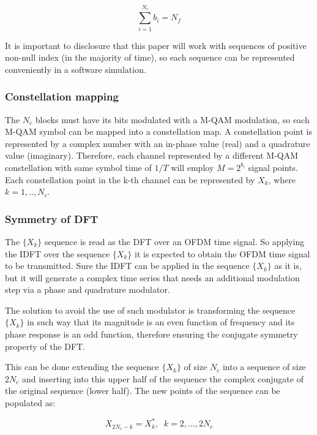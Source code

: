 \begin{equation} \label{eq:bit_sum}
    \sum_{i=1}^{N_c} b_i = N_f
\end{equation}

It is important to disclosure that this paper will work with sequences of positive non-null index (in the majority of time), so each sequence can be represented conveniently in a software simulation.

\subsubsection{Constellation mapping}

The $N_c$ blocks must have its bits modulated with a M-QAM modulation, so each M-QAM symbol can be mapped into a constellation map. A constellation point is represented by a complex number with an in-phase value (real) and a quadrature value (imaginary). Therefore, each channel represented by a different M-QAM constellation with same symbol time of $1/T$ will employ $M = 2^{b_i}$ signal points. Each constellation point in the k-th channel can be represented by $X_k$, where $k = 1,..,N_c$. 

\subsubsection{Symmetry of DFT}

The $\{X_k\}$ sequence is read as the DFT over an OFDM time signal. So applying the IDFT over the sequence $\{X_k\}$ it is expected to obtain the OFDM time signal to be transmitted. Sure the IDFT can be applied in the sequence $\{X_k\}$ as it is, but it will generate a complex time series that needs an additional modulation step via a phase and quadrature modulator. 

The solution to avoid the use of such modulator is transforming the sequence $\{X_k\}$ in such way that its magnitude is an even function of frequency and its phase response is an odd function, therefore ensuring the conjugate symmetry property of the DFT.

This can be done extending the sequence $\{X_k\}$ of size $N_c$ into a sequence of size $2N_c$ and inserting into this upper half of the sequence the complex conjugate of the original sequence (lower half). The new points of the sequence can be populated as:

\begin{equation} \label{eq:symmetry}
    X_{2N_c-k}=X_k^*, \; \; k = 2,...,2N_c
\end{equation}

